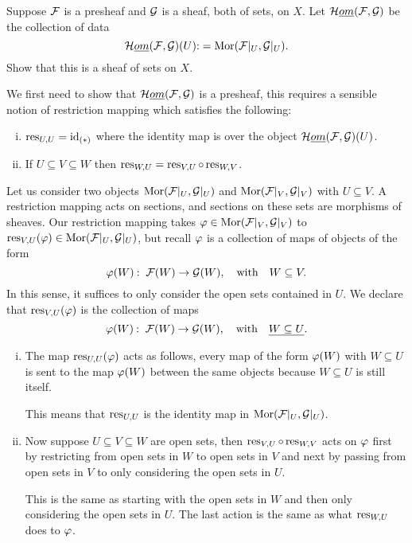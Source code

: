 \documentclass[12pt]{memoir}
\begin{document}

\begin{Ej}
   Suppose $\mathcal{F}$ is a presheaf and $\mathcal{G}$ is a sheaf, both of sets, on $X$. Let $\mathcal{H}\emph{om}(\mathcal{F},\mathcal{G})$ be the collection of data 
   $$\mathcal{H}\emph{om}(\mathcal{F},\mathcal{G})(U)\mathbin{:}=\operatorname{Mor}(\mathcal{F}|_U,\mathcal{G}|_U).$$
   Show that this is a sheaf of sets on $X$. 
\end{Ej}
\begin{ptcbr}
    We first need to show that $\mathcal{H}\emph{om}(\mathcal{F},\mathcal{G})$ is a presheaf, this requires a sensible notion of restriction mapping which satisfies the following:
    \begin{enumerate}[i)]
        \itemsep=-0.4em
        \item $\operatorname*{res}_{U,U}=\operatorname{id}_{(\ast)}$ where the identity map is over the object $\mathcal{H}\emph{om}(\mathcal{F},\mathcal{G})(U)$.
        \item If $U\subseteq V\subseteq W$ then $\operatorname*{res}_{W,U}=\operatorname*{res}_{V,U}\circ\operatorname*{res}_{W,V}$.
    \end{enumerate}
    Let us consider two objects $\operatorname{Mor}(\mathcal{F}|_U,\mathcal{G}|_U)$ and $\operatorname{Mor}(\mathcal{F}|_V,\mathcal{G}|_V)$ with $U\subseteq V$. A restriction mapping acts on sections, and sections on these sets are morphisms of sheaves. Our restriction mapping takes $\varphi\in\operatorname{Mor}(\mathcal{F}|_V,\mathcal{G}|_V)$ to $\operatorname*{res}_{V,U}(\varphi)\in\operatorname{Mor}(\mathcal{F}|_U,\mathcal{G}|_U)$, but recall $\varphi$ is a collection of maps of objects of the form 
    $$\vf(W)\:\ \cF(W)\to\cG(W),\word{with}W\subseteq V.$$
    In this sense, it suffices to only consider the open sets contained in $U$. We declare that $\operatorname*{res}_{V,U}(\varphi)$ is the collection of maps 
    $$\vf(W)\:\ \cF(W)\to\cG(W),\word{with}\un{W\subseteq U}.$$
    \begin{enumerate}[i)]
        \itemsep=-0.4em
        \item The map $\operatorname*{res}_{U,U}(\varphi)$ acts as follows, every map of the form $\varphi(W)$ with $W\subseteq U$ is sent to the map $\varphi(W)$ between the same objects because $W\subseteq U$ is still itself.\par 
        This means that $\operatorname*{res}_{U,U}$ is the identity map in $\operatorname{Mor}(\mathcal{F}|_U,\mathcal{G}|_U)$.
        \item Now suppose $U\subseteq V\subseteq W$ are open sets, then $\operatorname*{res}_{V,U}\circ\operatorname*{res}_{W,V}$ acts on $\varphi$ first by restricting from open sets in $W$ to open sets in $V$ and next by passing from open sets in $V$ to only considering the open sets in $U$.\par
        This is the same as starting with the open sets in $W$ and then only considering the open sets in $U$. The last action is the same as what $\operatorname*{res}_{W,U}$ does to $\varphi$.

\end{enumerate}
\end{ptcbr}
\end{document}
